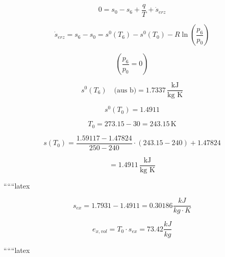 \[
0 = s_0 - s_6 + \frac{q}{T} + \dot{s}_{erz}
\]

\[
\dot{s}_{erz} = s_6 - s_0 = s^0(T_6) - s^0(T_0) - R \ln \left( \frac{p_6}{p_0} \right)
\]

\[
\left( \frac{p_6}{p_0} = 0 \right)
\]

\[
s^0(T_6) \quad \text{(aus b)} = 1.7337 \, \frac{\text{kJ}}{\text{kg K}}
\]

\[
s^0(T_0) = 1.4911
\]

\[
T_0 = 273.15 - 30 = 243.15 \, \text{K}
\]


\[
s(T_0) = \frac{1.59117 - 1.47824}{250 - 240} \cdot (243.15 - 240) + 1.47824
\]

\[
= 1.4911 \, \frac{\text{kJ}}{\text{kg K}}
\]

``````latex

\[
s_{ex} = 1.7931 - 1.4911 = 0.30186 \frac{kJ}{kg \cdot K}
\]

\[
e_{x, vol} = T_0 \cdot s_{ex} = 73.42 \frac{kJ}{kg}
\]

``````latex


